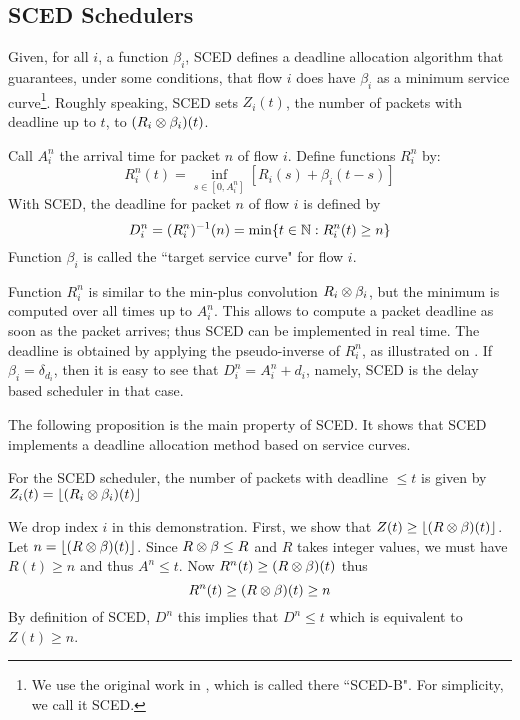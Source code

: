 \subsection{SCED Schedulers \cite{saro96}}
Given, for all $i$, a function $\beta_i$, SCED defines a deadline
allocation algorithm that guarantees, under some conditions, that
flow $i$ does have $\beta_i$ as a minimum service
curve\footnote{We use the original work in \cite{saro96}, which is
called there ``SCED-B". For simplicity, we call it SCED.}. Roughly
speaking, SCED sets $Z_i(t)$, the number of packets with deadline
up to $t$, to $(R_i \otimes \beta_i)(t)$.
\begin{definition}[SCED]
Call $A^n_i$ the arrival time for packet $n$ of flow $i$. Define
functions $R^n_i$ by:
$$
 R^n_i(t) = \inf_{s \in [0, A^n_i]} [R_i(s) + \beta_i (t-s)]
$$
With SCED, the deadline for packet $n$ of flow $i$ is defined by
$$
D^n_i = ( R^n_i)^{-1}(n) = \min \{t \in \mathbb{N} :  R^n_i(t) \geq n
\}
$$
Function $\beta_i$ is called the ``target service curve" for flow
$i$. 
\end{definition}
Function $R^n_i$ is similar to the min-plus convolution $R_i \otimes
\beta_i$, but the minimum is computed over all times up to
$A^n_i$. This allows to compute a packet deadline as soon as the
packet arrives; thus SCED can be implemented in real time. The
deadline is obtained by applying the pseudo-inverse of $R^n_i$, as
illustrated on . If $\beta_i=\delta_{d_i}$, then
it is easy to see that $D^n_i=A^n_i+d_i$, namely, SCED is the
delay based scheduler in that case.
\begin{figure}[!htbp]
\end{figure}
The following proposition is the main property of SCED. It shows
that SCED implements a deadline allocation method based on service
curves.
\begin{proposition}
 For the SCED scheduler, the number of packets with deadline
 $\leq t$ is given by $Z_i(t)=\lfloor (R_i \otimes \beta_i) (t)\rfloor$
\end{proposition}
\pr
We drop index $i$ in this demonstration. First, we show that
$Z(t)\geq \lfloor( R \otimes \beta)(t) \rfloor$. Let $n=\lfloor( R
\otimes \beta)(t)\rfloor$. Since $R \otimes \beta \leq R$ and $R$ takes
integer values, we must have $R(t) \geq n$ and thus $A^n \leq t$.
Now $R^n(t)\geq (R \otimes \beta)(t)$ thus
$$
R^n(t) \geq  (R \otimes \beta)(t) \geq n
$$
By definition of SCED, $D^n$ this implies that $D^n \leq t$ which
is equivalent to $Z(t) \geq n$.

